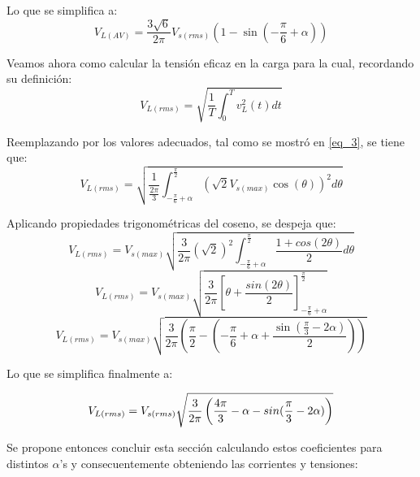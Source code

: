 \documentclass[12pt,a4paper]{article}
\begin{document}
Lo que se simplifica a:
\begin{equation}
    V_{L(AV)} = \frac{3\sqrt{6}}{2\pi}V_{s(rms)} \left(1 - \sin(-\frac{\pi}{6} + \alpha)\right)
    \label{eq_6}
\end{equation}

Veamos ahora como calcular la tensión eficaz en la carga para la cual, recordando su definición:
\begin{equation}
    V_{L(rms)} = \sqrt{\frac{1}{T} \int_{0}^{T} v_{L}^{2}(t) dt}
    \label{eq_7}
\end{equation}

Reemplazando por los valores adecuados, tal como se mostró en \eqref{eq_3}, se tiene que:
\begin{equation}
    V_{L(rms)} = \sqrt{\frac{1}{\frac{2\pi}{3}} \int_{-\frac{\pi}{6} + \alpha}^{\frac{\pi}{2}} (\sqrt{2} V_{s(max)} \cos(\theta))^{2} d\theta}
    \label{eq_8}
\end{equation}

Aplicando propiedades trigonométricas del coseno, se despeja que:
\begin{equation}
    V_{L(rms)} = V_{s(max)}\sqrt{\frac{3}{2\pi} (\sqrt{2})^2 \int_{-\frac{\pi}{6} + \alpha}^{\frac{\pi}{2}} \frac{1+cos(2\theta)}{2} d\theta}
    \label{eq_9}
\end{equation}
\begin{equation}
    V_{L(rms)} = V_{s(max)}\sqrt{\frac{3}{2\pi} \left[\theta+\frac{sin(2\theta)}{2}\right]_{-\frac{\pi}{6} + \alpha}^{\frac{\pi}{2}}}
    \label{eq_10}
\end{equation}
\begin{equation}
    V_{L(rms)} = V_{s(max)}\sqrt{\frac{3}{2\pi} \left( \frac{\pi}{2} - (-\frac{\pi}{6} + \alpha + \frac{\sin(\frac{\pi}{3} - 2\alpha)}{2}) \right)}
    \label{eq_11}
\end{equation}

Lo que se simplifica finalmente a:

\begin{equation}
    V_{L(rms)} = V_{s(rms)}\sqrt{\frac{3}{2\pi} \left( \frac{4\pi}{3} - \alpha - \\sin(\frac{\pi}{3} - 2\alpha) \right)}
    \label{eq_11}
\end{equation}

Se propone entonces concluir esta sección calculando estos coeficientes para distintos $\alpha$'s y consecuentemente obteniendo las corrientes y tensiones:
\end{document}
